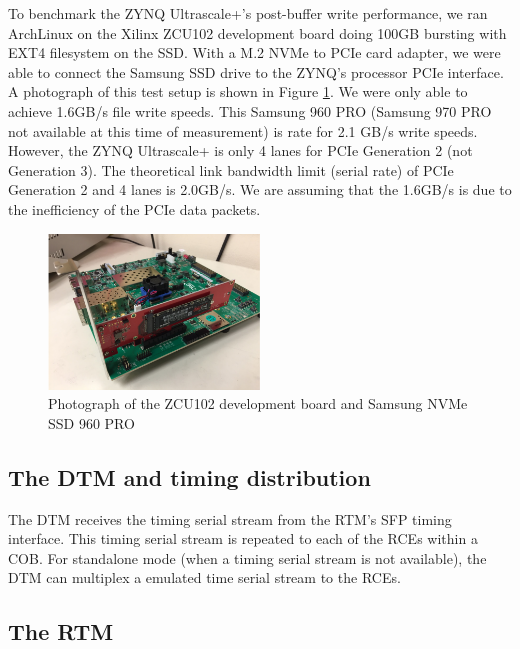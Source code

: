 To benchmark the ZYNQ Ultrascale+'s post-buffer write performance, we ran ArchLinux on the Xilinx ZCU102 development board doing 100GB bursting with EXT4 filesystem on the SSD.  With a M.2 NVMe to PCIe card adapter, we were able to connect the Samsung SSD drive to the ZYNQ's processor PCIe interface.  A photograph of this test setup is shown in Figure \ref{fig:NMVe_performance}. We were only able to achieve 1.6GB/s file write speeds.  This Samsung 960 PRO (Samsung 970 PRO not available at this time of measurement) is rate for 2.1 GB/s write speeds.  However, the ZYNQ Ultrascale+ is only 4 lanes for PCIe Generation 2 (not Generation 3).  The theoretical link bandwidth limit (serial rate) of PCIe Generation 2 and 4 lanes is 2.0GB/s.  We are assuming that the 1.6GB/s is due to the inefficiency of the PCIe data packets. 

\begin{figure}[tb]
\centering
\includegraphics[width=0.5\textwidth]{images/NMVe_performance.png}
\caption{\label{fig:NMVe_performance} Photograph of the ZCU102 development board and Samsung NVMe SSD 960 PRO}
\end{figure}

\subsection{The DTM and timing distribution}

The DTM receives the timing serial stream from the RTM's SFP timing interface.
This timing serial stream is repeated to each of the RCEs within a COB. 
For standalone mode (when a timing serial stream is not available), the 
DTM can multiplex a emulated time serial stream to the RCEs. 

\subsection{The RTM}

